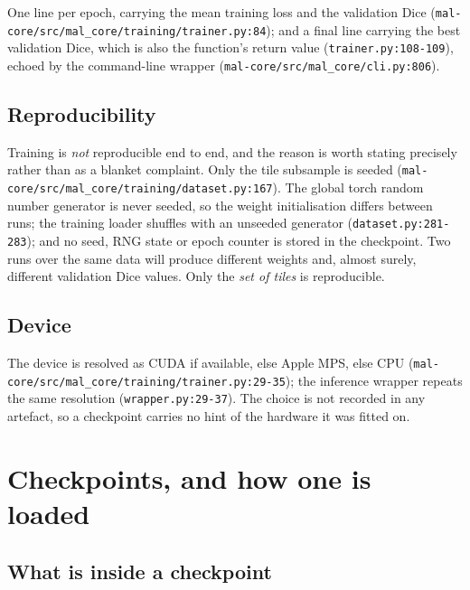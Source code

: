 \documentclass[11pt,a4paper]{article}
\newcommand{\codex}[1]{\texttt{#1}}
\begin{document}
One line per epoch, carrying the mean training loss and the validation Dice
(\codex{mal-core/\allowbreak{}src/\allowbreak{}mal\_\allowbreak{}core/\allowbreak{}training/\allowbreak{}trainer.py:84}); and a final line
carrying the best validation Dice, which is also the function's return value
(\codex{trainer.py:108-109}), echoed by the command-line wrapper
(\codex{mal-core/\allowbreak{}src/\allowbreak{}mal\_\allowbreak{}core/\allowbreak{}cli.py:806}).

\subsection{Reproducibility}

Training is \emph{not} reproducible end to end, and the reason is worth
stating precisely rather than as a blanket complaint. Only the tile
subsample is seeded (\codex{mal-core/\allowbreak{}src/\allowbreak{}mal\_\allowbreak{}core/\allowbreak{}training/\allowbreak{}dataset.py:167}).
The global torch random number generator is never seeded, so the weight
initialisation differs between runs; the training loader shuffles with an
unseeded generator (\codex{dataset.py:281-283}); and no seed, RNG state or
epoch counter is stored in the checkpoint. Two runs over the same data will
produce different weights and, almost surely, different validation Dice
values. Only the \emph{set of tiles} is reproducible.

\subsection{Device}

The device is resolved as CUDA if available, else Apple MPS, else CPU
(\codex{mal-core/\allowbreak{}src/\allowbreak{}mal\_\allowbreak{}core/\allowbreak{}training/\allowbreak{}trainer.py:29-35}); the inference
wrapper repeats the same resolution (\codex{wrapper.py:29-37}). The choice is
not recorded in any artefact, so a checkpoint carries no hint of the hardware
it was fitted on.

\section{Checkpoints, and how one is loaded}

\subsection{What is inside a checkpoint}
\end{document}

